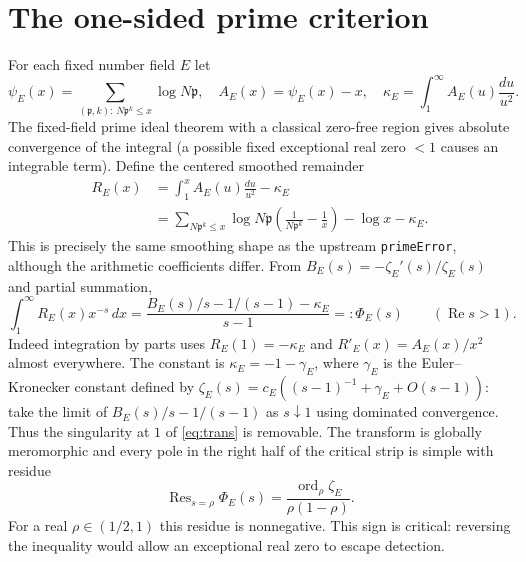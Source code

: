 \documentclass[11pt]{article}
\theoremstyle{remark}\newtheorem{remark}[theorem]{Remark}
\newcommand{\ord}{\operatorname{ord}}
\newcommand{\Rea}{\operatorname{Re}}
\begin{document}
\section{The one-sided prime criterion}
For each fixed number field $E$ let
\[
 \psi_E(x)=\sum_{(\mathfrak p,k):\,N\mathfrak p^k\le x}\log N\mathfrak p,
 \quad A_E(x)=\psi_E(x)-x,
 \quad \kappa_E=\int_1^\infty A_E(u)\frac{du}{u^2}.
\]
The fixed-field prime ideal theorem with a classical zero-free region gives absolute convergence of the integral (a possible fixed exceptional real zero $<1$ causes an integrable term). Define the centered smoothed remainder
\begin{align}
 R_E(x)&=\int_1^x A_E(u)\frac{du}{u^2}-\kappa_E\\
 &=\sum_{N\mathfrak p^k\le x}\log N\mathfrak p\left(\frac1{N\mathfrak p^k}-\frac1x\right)
      -\log x-\kappa_E.\label{eq:kernel}
\end{align}
This is precisely the same smoothing shape as the upstream \texttt{primeError}, although the arithmetic coefficients differ. From $B_E(s)=-\zeta_E'(s)/\zeta_E(s)$ and partial summation,
\begin{equation}\label{eq:trans}
 \int_1^\infty R_E(x)x^{-s}\,dx
 =\frac{B_E(s)/s-1/(s-1)-\kappa_E}{s-1}
 =:\Phi_E(s)\qquad(\Rea s>1).
\end{equation}
Indeed integration by parts uses $R_E(1)=-\kappa_E$ and $R'_E(x)=A_E(x)/x^2$ almost everywhere. The constant is $\kappa_E=-1-\gamma_E$, where $\gamma_E$ is the Euler--Kronecker constant defined by $\zeta_E(s)=c_E((s-1)^{-1}+\gamma_E+O(s-1))$: take the limit of $B_E(s)/s-1/(s-1)$ as $s\downarrow1$ using dominated convergence. Thus the singularity at $1$ of \eqref{eq:trans} is removable. The transform is globally meromorphic and every pole in the right half of the critical strip is simple with residue
\begin{equation}\label{eq:res}
 \operatorname{Res}_{s=\rho}\Phi_E(s)
 =\frac{\ord_\rho\zeta_E}{\rho(1-\rho)}.
\end{equation}
For a real $\rho\in(1/2,1)$ this residue is nonnegative. This sign is critical: reversing the inequality would allow an exceptional real zero to escape detection.
\end{document}
